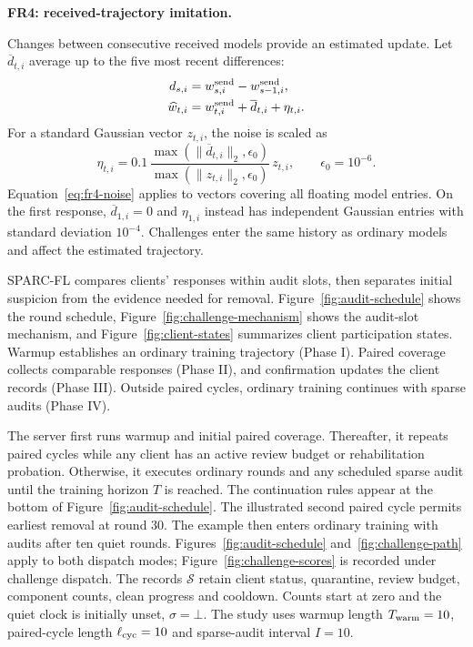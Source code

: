 \documentclass[journal]{IEEEtran}
\makeatletter
\renewcommand{\section}{\@startsection{section}{1}{\z@}{1.5ex}{0.7ex}{\normalfont\normalsize\centering\scshape}}
\makeatother
\begin{document}
\par\medskip\noindent\textbf{FR4: received-trajectory imitation.}\par\nopagebreak\smallskip\noindent
Changes between consecutive received models provide an estimated update.
Let $\overline d_{t,i}$ average up to the five most recent differences:
\begin{align}
 d_{s,i}&=w^{\rm send}_{s,i}-w^{\rm send}_{s-1,i},\\
 \widehat w_{t,i}&=w^{\rm send}_{t,i}+\overline d_{t,i}+\eta_{t,i}.
\end{align}
For a standard Gaussian vector $z_{t,i}$, the noise is scaled as
\begin{equation}\label{eq:fr4-noise}
 \eta_{t,i}=0.1\,
 \frac{\max(\|\overline d_{t,i}\|_2,\epsilon_0)}
      {\max(\|z_{t,i}\|_2,\epsilon_0)}\,z_{t,i},
 \qquad\epsilon_0=10^{-6}.
\end{equation}
Equation~\eqref{eq:fr4-noise} applies to vectors covering all floating
model entries. On the first response,
$\overline d_{1,i}=0$ and $\eta_{1,i}$ instead has independent Gaussian entries with
standard deviation $10^{-4}$. Challenges enter the same history as ordinary
models and affect the estimated trajectory.


\section{Proposed Methodology}\label{sec:method}
SPARC-FL compares clients' responses within audit slots, then separates
initial suspicion from the evidence needed for removal.
Figure~\ref{fig:audit-schedule} shows the round schedule,
Figure~\ref{fig:challenge-mechanism} shows the audit-slot mechanism, and
Figure~\ref{fig:client-states} summarizes client participation states.
Warmup establishes an ordinary training trajectory
(Phase I). Paired coverage collects comparable responses
(Phase II), and confirmation updates the client records
(Phase III). Outside paired cycles, ordinary training
continues with sparse audits (Phase IV).

The server first runs warmup and initial paired coverage. Thereafter, it
repeats paired cycles while any client has an active review budget or
rehabilitation probation. Otherwise, it executes ordinary rounds and any
scheduled sparse audit until the training horizon $T$ is reached. The
continuation rules appear at the bottom of Figure~\ref{fig:audit-schedule}.
The illustrated second paired cycle permits earliest removal at round 30.
The example then enters ordinary training with audits after ten quiet rounds.
Figures~\ref{fig:audit-schedule} and~\ref{fig:challenge-path} apply to both dispatch modes; Figure~\ref{fig:challenge-scores} is recorded under challenge dispatch.
The records $\mathcal S$ retain client status, quarantine, review budget,
component counts, clean progress and cooldown. Counts start at zero and
the quiet clock is initially unset, $\sigma=\bot$. The study uses warmup length
$T_{\rm warm}=10$, paired-cycle length $\ell_{\rm cyc}=10$ and sparse-audit interval $I=10$.
\end{document}
